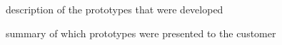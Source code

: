 description of the prototypes that were developed

summary of which prototypes were presented to the customer